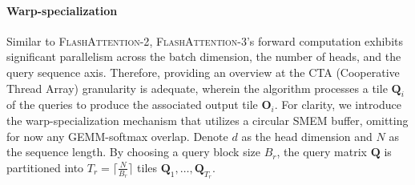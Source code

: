\paragraph{Warp-specialization}
Similar to \textsc{FlashAttention-2}, \textsc{FlashAttention-3}'s forward computation exhibits significant parallelism across the batch dimension, the number of heads, and the query sequence axis. Therefore, providing an overview at the CTA (Cooperative Thread Array) granularity is adequate, wherein the algorithm processes a tile $\mathbf{Q}_i$ of the queries to produce the associated output tile $\mathbf{O}_i$. For clarity, we introduce the warp-specialization mechanism that utilizes a circular SMEM buffer, omitting for now any GEMM-softmax overlap. Denote $d$ as the head dimension and $N$ as the sequence length. By choosing a query block size $B_r$, the query matrix $\mathbf{Q}$ is partitioned into $T_r = \lceil \frac{N}{B_r} \rceil$ tiles $\mathbf{Q}_1, \ldots, \mathbf{Q}_{T_r}$.

